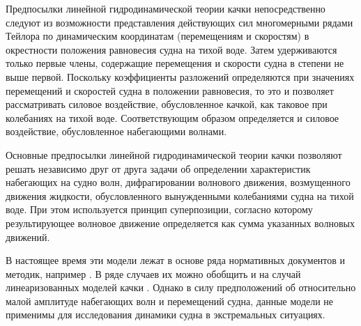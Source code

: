 Предпосылки линейной гидродинамической теории качки непосредственно следуют из возможности представления действующих сил многомерными рядами Тейлора по динамическим координатам (перемещениям и скоростям) в окрестности положения равновесия судна на тихой воде. Затем удерживаются только первые члены, содержащие перемещения и скорости судна в степени не выше первой. Поскольку коэффициенты разложений определяются при значениях перемещений и скоростей судна в положении равновесия, то это и позволяет рассматривать силовое воздействие, обусловленное качкой, как таковое при колебаниях на тихой воде. Соответствующим образом определяется и силовое воздействие, обусловленное набегающими волнами.

Основные предпосылки линейной гидродинамической теории качки позволяют решать независимо друг от друга задачи об определении характеристик набегающих на судно волн, дифрагировании волнового движения, возмущенного движения жидкости, обусловленного вынужденными колебаниями судна на тихой воде. При этом используется принцип суперпозиции, согласно которому результирующее волновое движение определяется как сумма указанных волновых движений. 

В настоящее время эти модели лежат в основе ряда нормативных документов и методик, например \citep{dk14}\citep{dk15}. В ряде случаев их можно обобщить и на случай линеаризованных моделей качки \citep{dk1}. Однако в силу предположений об относительно малой амплитуде набегающих волн и перемещений судна, данные модели не применимы для исследования динамики судна в экстремальных ситуациях.


